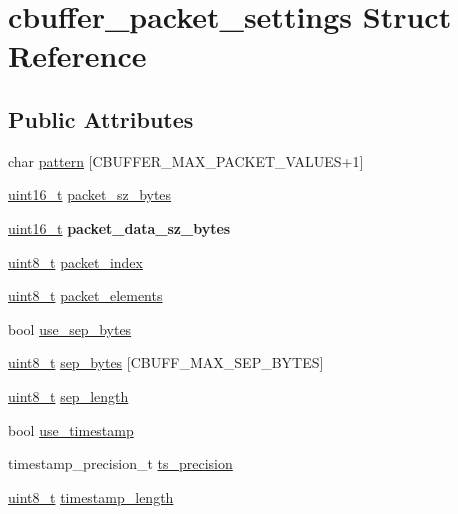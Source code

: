 \hypertarget{structcbuffer__packet__settings}{}\section{cbuffer\+\_\+packet\+\_\+settings Struct Reference}
\label{structcbuffer__packet__settings}
\subsection*{Public Attributes}
\begin{DoxyCompactItemize}
\item 
char \hyperlink{structcbuffer__packet__settings_a625fc334bda2128610d3c7092e2e7e6f}{pattern} \mbox{[}C\+B\+U\+F\+F\+E\+R\+\_\+\+M\+A\+X\+\_\+\+P\+A\+C\+K\+E\+T\+\_\+\+V\+A\+L\+U\+ES+1\mbox{]}
\item 
\hyperlink{vl53l0x__types_8h_a273cf69d639a59973b6019625df33e30}{uint16\+\_\+t} \hyperlink{structcbuffer__packet__settings_a6db08ec491da7a19d2de05763404fcd5}{packet\+\_\+sz\+\_\+bytes}
\item 
\mbox{\label{structcbuffer__packet__settings_a9cf63eccf0ec69fec0270831c297dc5a}} 
\hyperlink{vl53l0x__types_8h_a273cf69d639a59973b6019625df33e30}{uint16\+\_\+t} {\bfseries packet\+\_\+data\+\_\+sz\+\_\+bytes}
\item 
\hyperlink{vl53l0x__types_8h_aba7bc1797add20fe3efdf37ced1182c5}{uint8\+\_\+t} \hyperlink{structcbuffer__packet__settings_a1bb8624e623cd110beff5b61903c58b0}{packet\+\_\+index}
\item 
\hyperlink{vl53l0x__types_8h_aba7bc1797add20fe3efdf37ced1182c5}{uint8\+\_\+t} \hyperlink{structcbuffer__packet__settings_a1bee99c717c78de86c7f13f772c4e7dc}{packet\+\_\+elements}
\item 
bool \hyperlink{structcbuffer__packet__settings_a526b8c6eea467c865d12d3073c6fd7de}{use\+\_\+sep\+\_\+bytes}
\item 
\hyperlink{vl53l0x__types_8h_aba7bc1797add20fe3efdf37ced1182c5}{uint8\+\_\+t} \hyperlink{structcbuffer__packet__settings_ab77dc189187fc26fa12d102315b94ff4}{sep\+\_\+bytes} \mbox{[}C\+B\+U\+F\+F\+\_\+\+M\+A\+X\+\_\+\+S\+E\+P\+\_\+\+B\+Y\+T\+ES\mbox{]}
\item 
\hyperlink{vl53l0x__types_8h_aba7bc1797add20fe3efdf37ced1182c5}{uint8\+\_\+t} \hyperlink{structcbuffer__packet__settings_a2b565068315eeb0f32b9b80640ad4680}{sep\+\_\+length}
\item 
bool \hyperlink{structcbuffer__packet__settings_ae1f27c64de7c208607ddba469e702ccb}{use\+\_\+timestamp}
\item 
timestamp\+\_\+precision\+\_\+t \hyperlink{structcbuffer__packet__settings_a14a94ea11d0ad1145e3826cc08af8d49}{ts\+\_\+precision}
\item 
\hyperlink{vl53l0x__types_8h_aba7bc1797add20fe3efdf37ced1182c5}{uint8\+\_\+t} \hyperlink{structcbuffer__packet__settings_a16a0d225c3b4bfc0dcda73b5580bf000}{timestamp\+\_\+length}
\end{DoxyCompactItemize}


